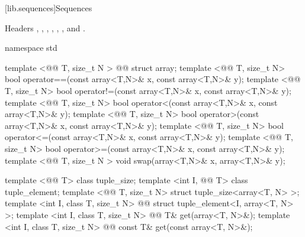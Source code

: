 \documentclass[american,twoside]{book}
\begin{document}
[lib.sequences]{Sequences}

\pnum
Headers , , , , , , and .

%
%
\begin{codeblock}
namespace std {
  template <@@ T, size_t N > 
    @@
    struct array;
  template <@@ T, size_t N>
    bool operator==(const array<T,N>& x, const array<T,N>& y);
  template <@@ T, size_t N>
    bool operator!=(const array<T,N>& x, const array<T,N>& y);
  template <@@ T, size_t N>
    bool operator<(const array<T,N>& x, const array<T,N>& y);
  template <@@ T, size_t N>
    bool operator>(const array<T,N>& x, const array<T,N>& y);
  template <@@ T, size_t N>
    bool operator<=(const array<T,N>& x, const array<T,N>& y);
  template <@@ T, size_t N>
    bool operator>=(const array<T,N>& x, const array<T,N>& y);
  template <@@ T, size_t N >
    void swap(array<T,N>& x, array<T,N>& y);

  template <@@ T> class tuple_size;
  template <int I, @@ T> 
    class tuple_element;
  template <@@ T, size_t N>
    struct tuple_size<array<T, N> >;
  template <int I, class T, size_t N>
    @@
    struct tuple_element<I, array<T, N> >;
  template <int I, class T, size_t N>
    @@
    T& get(array<T, N>&); 
  template <int I, class T, size_t N>
    @@
    const T& get(const array<T, N>&);
}
\end{codeblock}

%
\end{document}
